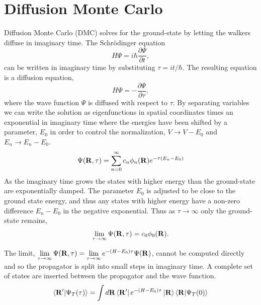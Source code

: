 \section{Diffusion Monte Carlo}
Diffusion Monte Carlo (DMC) solves for the ground-state by letting the walkers diffuse in imaginary time. The Schr\"odinger equation
\begin{equation}
   H\Psi = i\hbar\frac{\partial\Psi}{\partial t},
\end{equation}
can be written in imaginary time by substituting $\tau=it/\hbar$. The resulting equation is a diffusion equation,
\begin{equation}
   H\Psi = -\frac{\partial\Psi}{\partial\tau},
   \label{equ:diffusion}
\end{equation}
where the wave function $\Psi$ is diffused with respect to $\tau$. By separating variables we can write the solution as eigenfunctions in spatial coordinates times an exponential in imaginary time where the energies have been shifted by a parameter, $E_0$ in order to control the normalization, $V\rightarrow V - E_0$ and $E_n \rightarrow E_n-E_0$.
\begin{equation}
   \Psi(\mathbf{R},\tau) = \sum\limits_{n=0}^\infty c_n\phi_n(\mathbf{R})e^{-\tau(E_n-E_0)}
\end{equation}
As the imaginary time grows the states with higher energy than the ground-state are exponentially damped. The parameter $E_0$ is adjusted to be close to the ground state energy, and thus any states with higher energy have a non-zero difference $E_n-E_0$ in the negative exponential. Thus as $\tau\rightarrow\infty$ only the ground-state remains,
\begin{equation}
   \lim\limits_{\tau\rightarrow\infty}\Psi(\mathbf{R},\tau) = c_0\phi_0(\mathbf{R}).
\end{equation}

The limit, $\lim\limits_{\tau\rightarrow\infty}\Psi(\mathbf{R},\tau) = \lim\limits_{\tau\rightarrow\infty}e^{-(H-E_0)\tau}\Psi(\mathbf{R})$, cannot be computed directly and so the propagator is split into small steps in imaginary time. A complete set of states are inserted between the propagator and the wave function.
\begin{equation}
   \left< \mathbf{R}' | \Psi_T(\tau) \right> = \int d\mathbf{R} \left< \mathbf{R}' \right|e^{-(H-E_0)\tau}\left| \mathbf{R} \right>\left< \mathbf{R} | \Psi_T(0) \right>
\end{equation}

